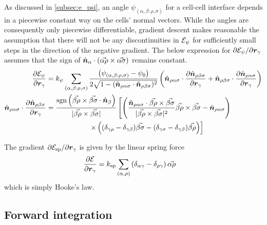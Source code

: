 As discussed in \ref{subsec:e_psi}, an angle $\psi_{(\alpha, \beta: \rho, \sigma)}$ for a cell-cell interface depends in a piecewise constant way on the cells' normal vectors. While the angles are consequently only piecewise differentiable, gradient descent makes reasonable the assumption that there will not be any discontinuities in $\mathcal{E}_\psi$ for sufficiently small steps in the direction of the negative gradient. The below expression for $\partial \mathcal{E}_\psi / \partial \bm{r}_\gamma$ assumes that the sign of $\hat{\bm{n}}_\alpha \cdot (\vec{\alpha\rho}\times \vec{\alpha\sigma})$ remains constant.
\begin{align}
	\frac{\partial \mathcal{E}_\psi}{\partial \bm{r}_\gamma} &= k_\psi \sum_{(\alpha,\beta: \rho,\sigma)} \frac{\left(\psi_{(\alpha,\beta:\rho,\sigma)} - \psi_0 \right)}{2\sqrt{1 - (\hat{\bm{n}}_{\rho\alpha\sigma}\cdot \hat{\bm{n}}_{\rho\beta\sigma})^2}} \left(\hat{\bm{n}}_{\rho\alpha\sigma} \cdot \frac{\partial \hat{\bm{n}}_{\rho\beta\sigma}}{\partial \bm{r}_\gamma} + \hat{\bm{n}}_{\rho\beta\sigma} \cdot \frac{\partial \hat{\bm{n}}_{\rho\alpha\sigma}}{\partial \bm{r}_\gamma} \right) \nonumber \\
	\hat{\bm{n}}_{\rho\alpha\sigma} \cdot \frac{\partial \hat{\bm{n}}_{\rho\beta\sigma}}{\partial \bm{r}_\gamma} &= \frac{\operatorname{sgn} \left(\vec{\beta\rho} \times \vec{\beta\sigma} \cdot \hat{\bm{n}}_\beta \right)}{|\vec{\beta\rho} \times \vec{\beta\sigma}|} \left[ \left(\frac{\hat{\bm{n}}_{\rho\alpha\sigma} \cdot \vec{\beta\rho}\times\vec{\beta\sigma}}{|\vec{\beta\rho}\times\vec{\beta\sigma}|^2} \vec{\beta\rho}\times\vec{\beta\sigma} - \hat{\bm{n}}_{\rho\alpha\sigma} \right) \right. \nonumber \\
	&\qquad\qquad\qquad \left. \times \left( (\delta_{\gamma\rho} - \delta_{\gamma\beta}) \vec{\beta\sigma} - (\delta_{\gamma\sigma} - \delta_{\gamma\beta}) \vec{\beta\rho} \right) \right] \label{eq:grad_psi}
\end{align}

The gradient $\partial \mathcal{E}_{\text{sp}} / \partial \bm{r}_\gamma$ is given by the linear spring force 
\begin{align}
	\frac{\partial\mathcal{E}}{\partial\bm{r}_\gamma} &= k_{\text{sp}} \sum_{(\alpha,\rho)} \left(\delta_{\alpha\gamma} - \delta_{\rho\gamma} \right)\vec{\alpha\rho} \label{eq:grad_sp}
\end{align}
which is simply Hooke's law.

\subsection{Forward integration}

